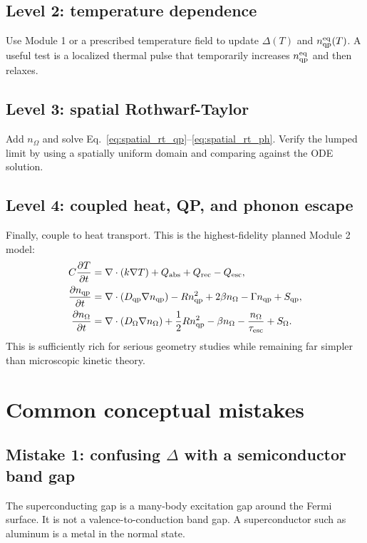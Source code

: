 \documentclass[11pt]{article}
\newcommand{\esc}{\mathrm{esc}}
\newcommand{\rec}{\mathrm{rec}}
\newcommand{\eq}{\mathrm{eq}}
\begin{document}
\subsection{Level 2: temperature dependence}
Use Module 1 or a prescribed temperature field to update $\Delta(T)$ and $n_{\qp}^{\eq}(T)$. A useful test is a localized thermal pulse that temporarily increases $n_{\qp}^{\eq}$ and then relaxes.

\subsection{Level 3: spatial Rothwarf-Taylor}
Add $n_{\Omega}$ and solve Eq.~\eqref{eq:spatial_rt_qp}--\eqref{eq:spatial_rt_ph}. Verify the lumped limit by using a spatially uniform domain and comparing against the ODE solution.

\subsection{Level 4: coupled heat, QP, and phonon escape}
Finally, couple to heat transport. This is the highest-fidelity planned Module 2 model:
\begin{align}
C\frac{\partial T}{\partial t}&=\nabla\cdot(k\nabla T)+Q_{\mathrm{abs}}+Q_{\rec}-Q_{\esc},\\
\frac{\partial n_{\qp}}{\partial t}&=\nabla\cdot(D_{\qp}\nabla n_{\qp})-Rn_{\qp}^2+2\beta n_{\Omega}-\Gamma n_{\qp}+S_{\qp},\\
\frac{\partial n_{\Omega}}{\partial t}&=\nabla\cdot(D_{\Omega}\nabla n_{\Omega})+\frac{1}{2}Rn_{\qp}^2-\beta n_{\Omega}-\frac{n_{\Omega}}{\tau_{\esc}}+S_{\Omega}.
\end{align}
This is sufficiently rich for serious geometry studies while remaining far simpler than microscopic kinetic theory.

\section{Common conceptual mistakes}

\subsection{Mistake 1: confusing $\Delta$ with a semiconductor band gap}
The superconducting gap is a many-body excitation gap around the Fermi surface. It is not a valence-to-conduction band gap. A superconductor such as aluminum is a metal in the normal state.
\end{document}
